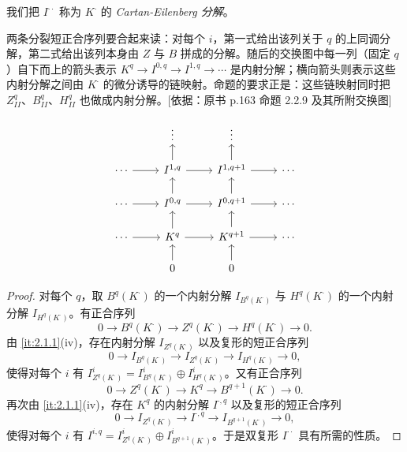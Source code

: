 我们把 $I^{\cdot\cdot}$ 称为 $K^{\cdot}$ 的 \emph{Cartan-Eilenberg 分解}。
\begin{tnote}
两条分裂短正合序列要合起来读：对每个 $i$，第一式给出该列关于 $q$ 的上同调分解，第二式给出该列本身由 $Z$ 与 $B$ 拼成的分解。随后的交换图中每一列（固定 $q$）自下而上的箭头表示 $K^q\to I^{0,q}\to I^{1,q}\to\cdots$ 是内射分解；横向箭头则表示这些内射分解之间由 $K^{\cdot}$ 的微分诱导的链映射。命题的要求正是：这些链映射同时把 $Z_{II}^q$、$B_{II}^q$、$H_{II}^q$ 也做成内射分解。[依据：原书 p.163 命题 2.2.9 及其所附交换图]
\end{tnote}
\[\begin{tikzcd}[row sep=1.5em,column sep=2.4em]
& \vdots & \vdots & \\
\cdots \arrow[r] & I^{1,q} \arrow[r] \arrow[u] & I^{1,q+1} \arrow[r] \arrow[u] & \cdots \\
\cdots \arrow[r] & I^{0,q} \arrow[r] \arrow[u] & I^{0,q+1} \arrow[r] \arrow[u] & \cdots \\
\cdots \arrow[r] & K^{q} \arrow[r] \arrow[u] & K^{q+1} \arrow[r] \arrow[u] & \cdots \\
& 0 \arrow[u] & 0 \arrow[u] &
\end{tikzcd}\]
\begin{proof}
对每个 $q$，取 $B^q(K^{\cdot})$ 的一个内射分解 $I_{B^q(K^{\cdot})}$ 与 $H^q(K^{\cdot})$ 的一个内射分解 $I_{H^q(K^{\cdot})}$。有正合序列
\[
0\to B^q(K^{\cdot})\to Z^q(K^{\cdot})\to H^q(K^{\cdot})\to 0.
\]
由 \ref{it:2.1.1}(iv)，存在内射分解 $I_{Z^q(K^{\cdot})}$ 以及复形的短正合序列
\[
0\to I_{B^q(K^{\cdot})}\to I_{Z^q(K^{\cdot})}\to I_{H^q(K^{\cdot})}\to 0,
\]
使得对每个 $i$ 有 $I_{Z^q(K^{\cdot})}^i=I_{B^q(K^{\cdot})}^i\oplus I_{H^q(K^{\cdot})}^i$。又有正合序列
\[
0\to Z^q(K^{\cdot})\to K^q\to B^{q+1}(K^{\cdot})\to 0.
\]
再次由 \ref{it:2.1.1}(iv)，存在 $K^q$ 的内射分解 $I^{\cdot,q}$ 以及复形的短正合序列
\[
0\to I_{Z^q(K^{\cdot})}\to I^{\cdot,q}\to I_{B^{q+1}(K^{\cdot})}\to 0,
\]
使得对每个 $i$ 有 $I^{i,q}=I_{Z^q(K^{\cdot})}^i\oplus I_{B^{q+1}(K^{\cdot})}^i$。于是双复形 $I^{\cdot\cdot}$ 具有所需的性质。
\end{proof}

